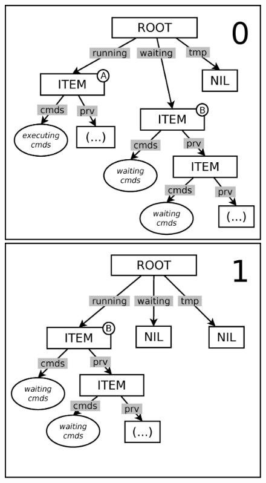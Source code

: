 \documentclass{sig-alternate}
\begin{document}
\begin{figure}[t]
\begin{minipage}[t]{0.33\linewidth}
\centering
\includegraphics[scale=0.23]{queue-10.eps}
\end{minipage}
\begin{minipage}[t]{0.33\linewidth}
\centering
\includegraphics[scale=0.23]{queue-11.eps}

\end{minipage}
\end{figure}
\end{document}
